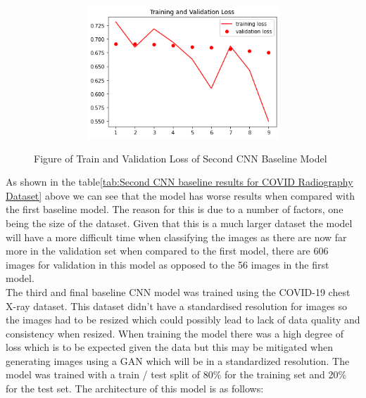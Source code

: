  \begin{figure}[H]
    \centering
    \includegraphics[width=1\textwidth,height=5cm,keepaspectratio]{Images/SecondCNNBaselineTrainAndValLoss.PNG}\\
    \caption{Figure of Train and Validation Loss of Second CNN Baseline Model}
    \label{fig:Second CNN Baseline Train and Validation Loss}
\end{figure}
As shown in the table\ref{tab:Second CNN baseline results for COVID Radiography Dataset} above we can see that the model has worse results when compared with the first baseline model.  The reason for this is due to a number of factors, one being the size of the dataset.  Given that this is a much larger dataset the model will have a more difficult time when classifying the images as there are now far more in the validation set when compared to the first model, there are 606 images for validation in this model as opposed to the 56 images in the first model.
\\
The third and final baseline CNN model was trained using the COVID-19 chest X-ray dataset. This dataset didn't have a standardised resolution for images so the images had to be resized which could possibly lead to lack of data quality and consistency when resized.  When training the model there was a high degree of loss which is to be expected given the data but this may be mitigated when generating images using a GAN which will be in a standardized resolution.  The model was trained with a train / test split of 80\% for the training set and 20\% for the test set.  The architecture of this model is as follows:
